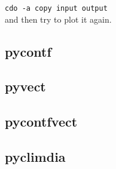 \texttt{cdo -a copy input output}\\

and then try to plot it again.

\subsection{pycontf}

\subsection{pyvect}

\subsection{pycontfvect}

\subsection{pyclimdia}

